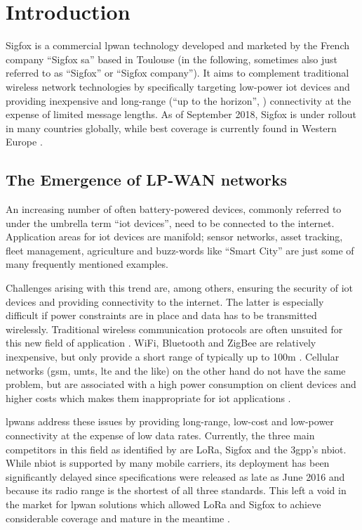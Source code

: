 
\chapter{Introduction}
\label{sec:introduction}
Sigfox is a commercial \gls{lpwan} technology developed and marketed by the French company ``Sigfox \gls{sa}'' based in Toulouse (in the following, sometimes also just referred to as ``Sigfox'' or ``Sigfox company'').
It aims to complement traditional wireless network technologies by specifically targeting low-power \gls{iot} devices and providing inexpensive and long-range (``up to the horizon'', \cite[Section 3.3]{phyandmac}) connectivity at the expense of limited message lengths.
As of September 2018, Sigfox is under rollout in many countries globally, while best coverage is currently found in Western Europe \cite{coveragemap}.

\FloatBarrier
\section{The Emergence of LP-WAN networks}
An increasing number of often battery-powered devices, commonly referred to under the umbrella term ``\gls{iot} devices'', need to be connected to the internet.
Application areas for \gls{iot} devices are manifold; sensor networks, asset tracking, fleet management, agriculture and buzz-words like ``Smart City'' are just some of many frequently mentioned examples.

Challenges arising with this trend are, among others, ensuring the security of \gls{iot} devices and providing connectivity to the internet.
The latter is especially difficult if power constraints are in place and data has to be transmitted wirelessly.
Traditional wireless communication protocols are often unsuited for this new field of application \cite{iot_protocol_overview}.
WiFi, Bluetooth and ZigBee are relatively inexpensive, but only provide a short range of typically up to 100m \cite[Table 1]{iot_protocol_overview}.
Cellular networks (\gls{gsm}, \gls{umts}, \gls{lte} and the like) on the other hand do not have the same problem, but are associated with a high power consumption on client devices and higher costs which makes them inappropriate for \gls{iot} applications \cite{lpwan_comparison}.

\glspl{lpwan} address these issues by providing long-range, low-cost and low-power connectivity at the expense of low data rates.
Currently, the three main competitors in this field as identified by \cite[Section 1]{lpwan_comparison} are LoRa, Sigfox and the \gls{3gpp}'s \gls{nbiot}.
While \gls{nbiot} is supported by many mobile carriers, its deployment has been significantly delayed since specifications were released as late as June 2016 and because its radio range is the shortest of all three standards.
This left a void in the market for \gls{lpwan} solutions which allowed LoRa and Sigfox to achieve considerable coverage and mature in the meantime \cite[Section 3.5]{lpwan_comparison}.

